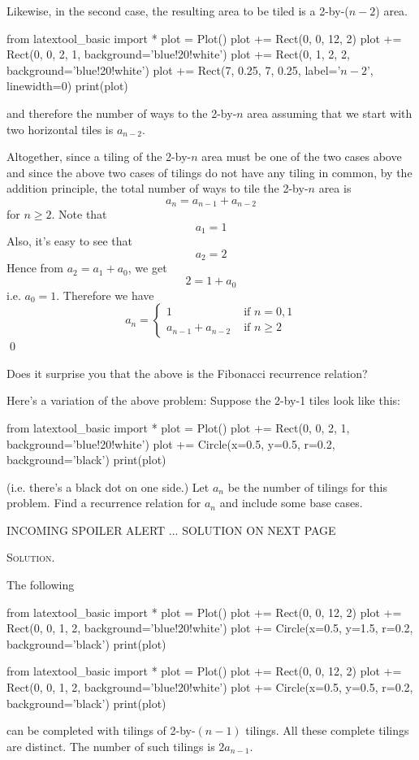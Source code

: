 Likewise, in the second case,
the resulting area to be tiled is a 2-by-($n-2$) area.
\begin{python}
from latextool_basic import *
plot = Plot()
plot += Rect(0, 0, 12, 2)
plot += Rect(0, 0, 2, 1, background='blue!20!white')
plot += Rect(0, 1, 2, 2, background='blue!20!white')
plot += Rect(7, 0.25, 7, 0.25, label='$n - 2$', linewidth=0)
print(plot)
\end{python}
and therefore the number of ways to the 2-by-$n$ area assuming that
we start with two horizontal tiles is $a_{n-2}$.

Altogether, since a tiling of the 2-by-$n$ area must be one of the two cases
above and since the above two cases
of tilings do not have any tiling in common, by the addition principle,
the total number of ways to tile the 2-by-$n$ area is
\[
a_n = a_{n-1} + a_{n-2}
\]
for $n \geq 2$.
Note that
\[
a_1 = 1
\]
Also, it's easy to see that
\[
a_2 = 2
\]
Hence from $a_2 = a_1 + a_0$, we get
\[
2 = 1 + a_0
\]
i.e. $a_0 = 1$.
Therefore we have
\[
a_n =
\begin{cases}
1 & \text{ if } n = 0, 1 \\
a_{n-1} + a_{n - 2} &\text{ if } n \geq 2
\end{cases}
\]
\qed

Does it surprise you that the above is the Fibonacci recurrence relation?



\newpage
\begin{ex}
Here's a variation of the above problem:
Suppose the 2-by-1 tiles look like this:
\begin{python}
from latextool_basic import *
plot = Plot()
plot += Rect(0, 0, 2, 1, background='blue!20!white')
plot += Circle(x=0.5, y=0.5, r=0.2, background='black')
print(plot)
\end{python}
(i.e. there's a black dot on one side.)
Let $a_n$ be the number of tilings for this problem.
Find a recurrence relation for $a_n$ and include some base cases.
\end{ex}

INCOMING SPOILER ALERT ... SOLUTION ON NEXT PAGE

\newpage
\textsc{Solution.}

The following
\begin{python}
from latextool_basic import *
plot = Plot()
plot += Rect(0, 0, 12, 2)
plot += Rect(0, 0, 1, 2, background='blue!20!white')
plot += Circle(x=0.5, y=1.5, r=0.2, background='black')
print(plot)
\end{python}
\begin{python}
from latextool_basic import *
plot = Plot()
plot += Rect(0, 0, 12, 2)
plot += Rect(0, 0, 1, 2, background='blue!20!white')
plot += Circle(x=0.5, y=0.5, r=0.2, background='black')
print(plot)
\end{python}
can be completed with tilings of 2-by-$(n-1)$ tilings.
All these complete tilings are distinct.
The number of such tilings is $2 a_{n-1}$.

